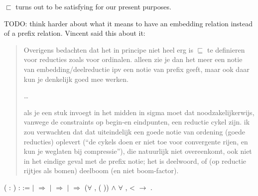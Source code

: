 $\sqsubset$ turns out to be satisfying for our present purposes.

TODO: think harder about what it means to have an embedding relation instead
of a prefix relation. Vincent said this about it:
\begin{quote}
Overigens bedachten dat het in principe niet heel erg is $\sqsubseteq$ te
definieren voor reducties zoals voor ordinalen. alleen zie je dan het meer een
notie van embedding/deelreductie ipv een notie van prefix geeft, maar ook daar
kun je denkelijk goed mee werken.

\ldots

als je een stuk invoegt in het midden in sigma moet dat noodzakelijkerwijs,
vanwege de constraints op begin-en eindpunten, een reductie cykel zijn. ik zou
verwachten dat dat uiteindelijk een goede notie van ordening (goede reducties)
oplevert (``de cykels doen er niet toe voor convergente rijen, en kun je
weglaten bij compressie''), die natuurlijk niet overeenkomt, ook niet in het
eindige geval met de prefix notie; het is deelwoord, of (op reductie rijtjes
als bomen) deelboom (en niet boom-factor).
\end{quote}

\begin{singlespace}
\begin{coqdoccode}
\coqdocnoindent
{} 
 
(\coqdocvar{$\varphi$} : 
) : 
:=\coqdoceol
\coqdocindent{1.00em}
 \coqdocvariable{$\varphi$} \coqdoceol
\coqdocindent{1.00em}
\ensuremath{|} 
\coqdocvar{\_}          \ensuremath{\Rightarrow}
\coqdoceol
\coqdocindent{1.00em}
\ensuremath{|} 
\coqdocvar{\_} \coqdocvar{\_} \coqdocvar{$\psi$} \coqdocvar{\_}
\coqdocvar{\_} \ensuremath{\Rightarrow}
\coqdocvariable{\coqdocvariable{$\psi$}}\coqdoceol
\coqdocindent{1.00em}
\ensuremath{|} 
\coqdocvar{\_} \coqdocvar{\_}  \coqdocvar{\_}
\coqdocvar{\_}  \ensuremath{\Rightarrow}
(\ensuremath{\forall} ,
 (
)) \ensuremath{\land}
\ensuremath{\forall}  , 
<  \ensuremath{\rightarrow} 
 \coqdoceol
\coqdocindent{1.00em}
.\coqdoceol
\end{coqdoccode}
\end{singlespace}
